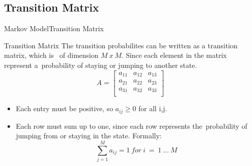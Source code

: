 \documentclass[10pt]{beamer}
\begin{document}
\subsection{Transition Matrix}
\begin{frame}{Markov Model}{Transition Matrix}
  \begin{block}{Transition Matrix}
  The transition probabilites can be written as a transition matrix, which is \
  of dimension $M\ x\ M$. Since each element in the matrix represent a\
  probability of staying or jumping to another state. \cite{Anders}
        \begin{equation}
            A = 
            \begin{bmatrix}
                a_{11} & a_{12} & a_{13}\\
                a_{21} & a_{22} & a_{23}\\
                a_{31} & a_{32} & a_{33}\\
            \end{bmatrix}
        \end{equation}
  \end{block}
  \begin{itemize}
      \item Each entry must be positive, so $a_{ij} \geqslant 0$ for all i,j.
      \item Each row must sum up to one, since each row represents the\
            probability of jumping from or staying in the state. Formally: \\
            \begin{equation}
               \sum_{j=1}^{M}a_{ij} = 1\ for\ i\ =\ 1\ ...\ M
            \end{equation} 
  \end{itemize}
\end{frame}

\end{document}
